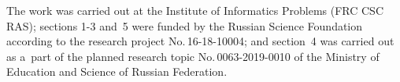 
 
  
  

\vspace*{-18pt}

 \Ack
 
 \vspace*{-4pt}
 
  \noindent
  The work was carried out at the Institute of Informatics Problems (FRC CSC 
RAS); sections 1-3 and~5 were funded by the Russian Science Foundation according 
to the research project No.\,16-18-10004; and section~4 was carried out as a~part of the 
planned research topic No.\,0063-2019-0010 of the Ministry of Education and
Science of Russian Federation.



